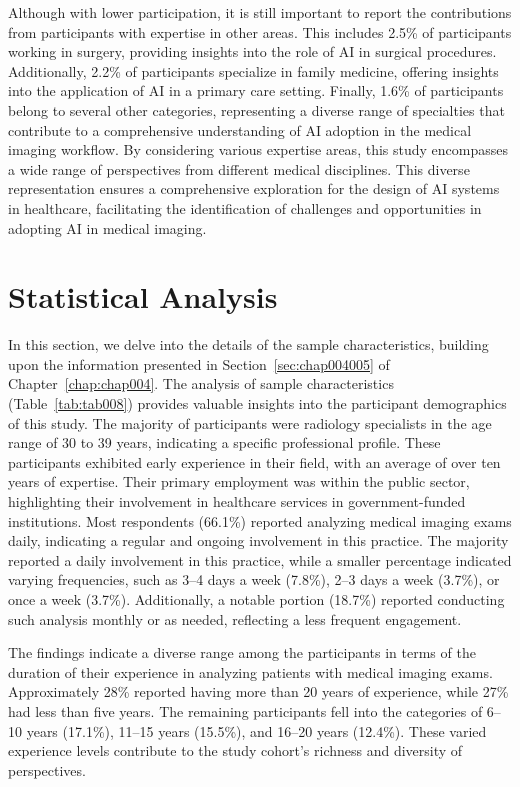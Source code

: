 Although with lower participation, it is still important to report the contributions from participants with expertise in other areas.
This includes 2.5\% of participants working in surgery, providing insights into the role of \ac{AI} in surgical procedures.
Additionally, 2.2\% of participants specialize in family medicine, offering insights into the application of AI in a primary care setting. Finally, 1.6\% of participants belong to several other categories, representing a diverse range of specialties that contribute to a comprehensive understanding of AI adoption in the medical imaging workflow.
By considering various expertise areas, this study encompasses a wide range of perspectives from different medical disciplines.
This diverse representation ensures a comprehensive exploration for the design of \ac{AI} systems in healthcare, facilitating the identification of challenges and opportunities in adopting \ac{AI} in medical imaging.

\section{Statistical Analysis}
\label{chap:app003004}

In this section, we delve into the details of the sample characteristics, building upon the information presented in Section~\ref{sec:chap004005} of Chapter~\ref{chap:chap004}.
The analysis of sample characteristics (Table~\ref{tab:tab008}) provides valuable insights into the participant demographics of this study.
The majority of participants were radiology specialists in the age range of 30 to 39 years, indicating a specific professional profile.
These participants exhibited early experience in their field, with an average of over ten years of expertise.
Their primary employment was within the public sector, highlighting their involvement in healthcare services in government-funded institutions.
Most respondents (66.1\%) reported analyzing medical imaging exams daily, indicating a regular and ongoing involvement in this practice.
The majority reported a daily involvement in this practice, while a smaller percentage indicated varying frequencies, such as 3--4 days a week (7.8\%), 2--3 days a week (3.7\%), or once a week (3.7\%).
Additionally, a notable portion (18.7\%) reported conducting such analysis monthly or as needed, reflecting a less frequent engagement.

The findings indicate a diverse range among the participants in terms of the duration of their experience in analyzing patients with medical imaging exams.
Approximately 28\% reported having more than 20 years of experience, while 27\% had less than five years.
The remaining participants fell into the categories of 6--10 years (17.1\%), 11--15 years (15.5\%), and 16--20 years (12.4\%).
These varied experience levels contribute to the study cohort's richness and diversity of perspectives.

